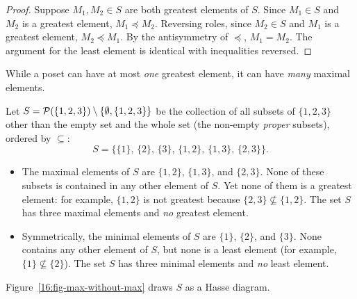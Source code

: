 \begin{proof}
Suppose $M_1, M_2 \in S$ are both greatest elements of $S$. Since $M_1 \in S$ and $M_2$ is a greatest element, $M_1 \preceq M_2$. Reversing roles, since $M_2 \in S$ and $M_1$ is a greatest element, $M_2 \preceq M_1$. By the antisymmetry of $\preceq$, $M_1 = M_2$. The argument for the least element is identical with inequalities reversed.
\end{proof}

While a poset can have at most \emph{one} greatest element, it can have \emph{many} maximal elements.

\begin{example}
Let $S = \mathcal{P}(\{1, 2, 3\}) \setminus \{\emptyset, \{1, 2, 3\}\}$ be the collection of all subsets of $\{1, 2, 3\}$ other than the empty set and the whole set (the non-empty \emph{proper} subsets), ordered by $\subseteq$:
\[
S = \big\{ \{1\}, \, \{2\}, \, \{3\}, \, \{1, 2\}, \, \{1, 3\}, \, \{2, 3\} \big\}.
\]
\begin{itemize}
\item The maximal elements of $S$ are $\{1, 2\}$, $\{1, 3\}$, and $\{2, 3\}$. None of these subsets is contained in any other element of $S$. Yet none of them is a greatest element: for example, $\{1, 2\}$ is not greatest because $\{2, 3\} \not\subseteq \{1, 2\}$. The set $S$ has three maximal elements and \emph{no} greatest element.
\item Symmetrically, the minimal elements of $S$ are $\{1\}$, $\{2\}$, and $\{3\}$. None contains any other element of $S$, but none is a least element (for example, $\{1\} \not\subseteq \{2\}$). The set $S$ has three minimal elements and \emph{no} least element.
\end{itemize}
Figure~\ref{16:fig-max-without-max} draws $S$ as a Hasse diagram.
\end{example}

